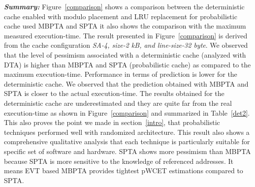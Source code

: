 \textit{\textbf{Summary:}} Figure~\ref{comparison} shows a comparison between the deterministic cache enabled with modulo placement and LRU replacement for  probabilistic cache used MBPTA and SPTA it also shows the comparison with the maximum measured execution-time. The result presented in Figure~\ref{comparison} is derived from the cache configuration \textit{SA-4, size-2 kB, and line-size-32 byte}. We observed that the level of pessimism associated with a deterministic cache (analyzed with DTA) is higher than MBPTA and SPTA (probabilistic cache) as compared to the maximum execution-time.  Performance in terms of prediction is lower for the deterministic cache. We observed that the prediction obtained with MBPTA and SPTA is closer to the actual execution-time. The results obtained for the deterministic cache are underestimated and they are quite far from the real execution-time as shown in Figure~\ref{comparison} and summarized in Table~\ref{det2}. This also proves the point we made in section~\ref{intro}, that probabilistic techniques performed well with randomized architecture. This result also shows a comprehensive qualitative analysis that each technique is particularly suitable for specific set of software and hardware. SPTA shows more pessimism than MBPTA because SPTA is more sensitive to the knowledge of referenced addresses. It means EVT based MBPTA provides tightest pWCET estimations compared to SPTA. 


